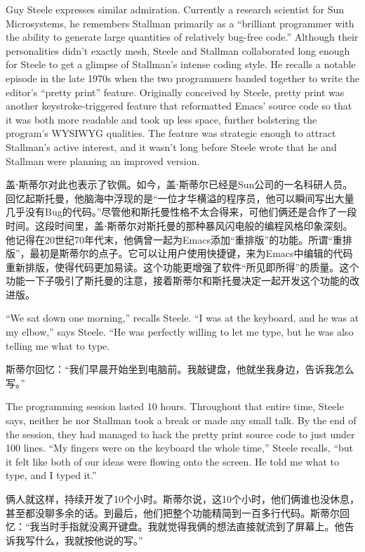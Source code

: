 \ifdefined\eng
Guy Steele expresses similar admiration. Currently a research scientist for Sun Microsystems, he remembers Stallman primarily as a ``brilliant programmer with the ability to generate large quantities of relatively bug-free code.'' Although their personalities didn't exactly mesh, Steele and Stallman collaborated long enough for Steele to get a glimpse of Stallman's intense coding style. He recalls a notable episode in the late 1970s when the two programmers banded together to write the editor's ``pretty print'' feature. Originally conceived by Steele, pretty print was another keystroke-triggered feature that reformatted Emacs' source code so that it was both more readable and took up less space, further bolstering the program's WYSIWYG qualities. The feature was strategic enough to attract Stallman's active interest, and it wasn't long before Steele wrote that he and Stallman were planning an improved version.
\fi

\ifdefined\chs
盖⋅斯蒂尔对此也表示了钦佩。如今，盖⋅斯蒂尔已经是Sun公司的一名科研人员。回忆起斯托曼，他脑海中浮现的是``一位才华横溢的程序员，他可以瞬间写出大量几乎没有Bug的代码。''尽管他和斯托曼性格不太合得来，可他们俩还是合作了一段时间。这段时间里，盖⋅斯蒂尔对斯托曼的那种暴风闪电般的编程风格印象深刻。他记得在20世纪70年代末，他俩曾一起为Emacs添加``重排版''的功能。所谓``重排版''，最初是斯蒂尔的点子。它可以让用户使用快捷键，来为Emacs中编辑的代码重新排版，使得代码更加易读。这个功能更增强了软件``所见即所得''的质量。这个功能一下子吸引了斯托曼的注意，接着斯蒂尔和斯托曼决定一起开发这个功能的改进版。
\fi

\ifdefined\eng
``We sat down one morning,'' recalls Steele. ``I was at the keyboard, and he was at my elbow,'' says Steele. ``He was perfectly willing to let me type, but he was also telling me what to type.
\fi

\ifdefined\chs
斯蒂尔回忆：``我们早晨开始坐到电脑前。我敲键盘，他就坐我身边，告诉我怎么写。''
\fi

\ifdefined\eng
The programming session lasted 10 hours. Throughout that entire time, Steele says, neither he nor Stallman took a break or made any small talk. By the end of the session, they had managed to hack the pretty print source code to just under 100 lines. ``My fingers were on the keyboard the whole time,'' Steele recalls, ``but it felt like both of our ideas were flowing onto the screen. He told me what to type, and I typed it.''
\fi

\ifdefined\chs
俩人就这样，持续开发了10个小时。斯蒂尔说，这10个小时，他们俩谁也没休息，甚至都没聊多余的话。到最后，他们把整个功能精简到一百多行代码。斯蒂尔回忆：``我当时手指就没离开键盘。我就觉得我俩的想法直接就流到了屏幕上。他告诉我写什么，我就按他说的写。''
\fi

